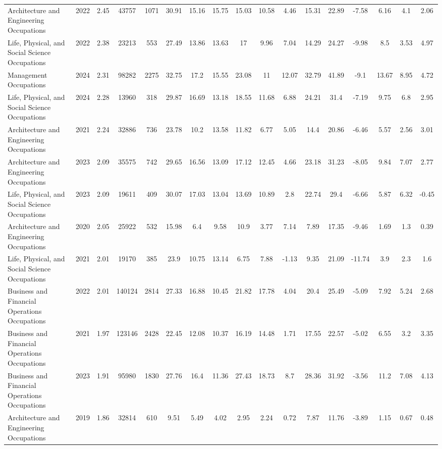 \begin{landscape}
\begin{table}[htbp]
\begin{tabular}{lcccccccccccccccc}
Architecture and Engineering Occupations & 2022 & 2.45 & 43757 & 1071 & 30.91 & 15.16 & 15.75 & 15.03 & 10.58 & 4.46 & 15.31 & 22.89 & -7.58 & 6.16 & 4.1 & 2.06 \\
Life, Physical, and Social Science Occupations & 2022 & 2.38 & 23213 & 553 & 27.49 & 13.86 & 13.63 & 17 & 9.96 & 7.04 & 14.29 & 24.27 & -9.98 & 8.5 & 3.53 & 4.97 \\
Management Occupations & 2024 & 2.31 & 98282 & 2275 & 32.75 & 17.2 & 15.55 & 23.08 & 11 & 12.07 & 32.79 & 41.89 & -9.1 & 13.67 & 8.95 & 4.72 \\
Life, Physical, and Social Science Occupations & 2024 & 2.28 & 13960 & 318 & 29.87 & 16.69 & 13.18 & 18.55 & 11.68 & 6.88 & 24.21 & 31.4 & -7.19 & 9.75 & 6.8 & 2.95 \\
Architecture and Engineering Occupations & 2021 & 2.24 & 32886 & 736 & 23.78 & 10.2 & 13.58 & 11.82 & 6.77 & 5.05 & 14.4 & 20.86 & -6.46 & 5.57 & 2.56 & 3.01 \\
Architecture and Engineering Occupations & 2023 & 2.09 & 35575 & 742 & 29.65 & 16.56 & 13.09 & 17.12 & 12.45 & 4.66 & 23.18 & 31.23 & -8.05 & 9.84 & 7.07 & 2.77 \\
Life, Physical, and Social Science Occupations & 2023 & 2.09 & 19611 & 409 & 30.07 & 17.03 & 13.04 & 13.69 & 10.89 & 2.8 & 22.74 & 29.4 & -6.66 & 5.87 & 6.32 & -0.45 \\
Architecture and Engineering Occupations & 2020 & 2.05 & 25922 & 532 & 15.98 & 6.4 & 9.58 & 10.9 & 3.77 & 7.14 & 7.89 & 17.35 & -9.46 & 1.69 & 1.3 & 0.39 \\
Life, Physical, and Social Science Occupations & 2021 & 2.01 & 19170 & 385 & 23.9 & 10.75 & 13.14 & 6.75 & 7.88 & -1.13 & 9.35 & 21.09 & -11.74 & 3.9 & 2.3 & 1.6 \\
Business and Financial Operations Occupations & 2022 & 2.01 & 140124 & 2814 & 27.33 & 16.88 & 10.45 & 21.82 & 17.78 & 4.04 & 20.4 & 25.49 & -5.09 & 7.92 & 5.24 & 2.68 \\
Business and Financial Operations Occupations & 2021 & 1.97 & 123146 & 2428 & 22.45 & 12.08 & 10.37 & 16.19 & 14.48 & 1.71 & 17.55 & 22.57 & -5.02 & 6.55 & 3.2 & 3.35 \\
Business and Financial Operations Occupations & 2023 & 1.91 & 95980 & 1830 & 27.76 & 16.4 & 11.36 & 27.43 & 18.73 & 8.7 & 28.36 & 31.92 & -3.56 & 11.2 & 7.08 & 4.13 \\
Architecture and Engineering Occupations & 2019 & 1.86 & 32814 & 610 & 9.51 & 5.49 & 4.02 & 2.95 & 2.24 & 0.72 & 7.87 & 11.76 & -3.89 & 1.15 & 0.67 & 0.48 \\

\end{tabular}
\end{table}
\end{landscape}
